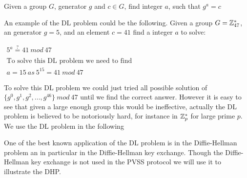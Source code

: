 \begin{defi}
Given a group $G$, generator $g$ and $c \in G$, find integer $a$, such that $g^a = c$
\end{defi}

\noindent
An example of the DL problem could be the following. Given a group $G = \mathbb{Z}_{47}^*$, an generator $g=5$, and an element $c = 41$ find a integer $a$ to solve: 

\begin{center}
$
\begin{array}{l}
     5^a \stackrel{?}{=} 41 \ mod \ 47 \\
     \\
     \text{To solve this DL problem we need to find} \\
     a = 15 \ as \ 5^{15} = 41 \ mod \ 47
\end{array}
$
\end{center}

\noindent
To solve this DL problem we could just tried all possible solution of \\
$ \{g^0, g^1, g^2,...,g^{46}\} \ mod \ 47$ until we find the correct answer. However it is easy to see that given a large enough group this would be ineffective, actually the DL problem is believed to be notoriously hard, for instance in $\mathbb{Z}_p^*$ for large prime $p$. \\

\noindent
We use the DL problem in the following

\iffalse
    \begin{defi}[Computational Diffie-Hellman (CDH) problem]
    \begin{math}g\in\Z_p, \ g\neq1 \end{math}\\
    Given \begin{math}(g,g^a,g^b)\end{math} find(compute)  \begin{math}(g^{a*b})\end{math} is hard problem.\\
    Definition: Need a reference?? \\
    \textcolor{red}{Kasper}
    \end{defi}
\fi

One of the best known application of the DL problem is in the Diffie-Hellman problem an in particular in the Diffie-Hellman key exchange. Though the Diffie-Hellman key exchange is not used in the PVSS protocol we will use it to illustrate the DHP.


